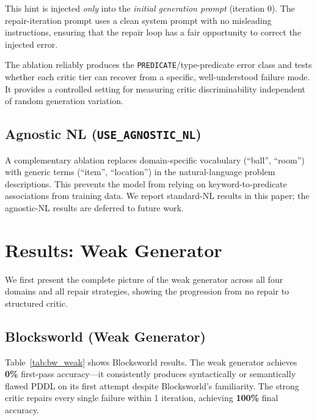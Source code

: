 \documentclass{article}
\begin{document}
This hint is injected \emph{only} into the \emph{initial generation prompt} (iteration
0).  The repair-iteration prompt uses a clean system prompt with no misleading
instructions, ensuring that the repair loop has a fair opportunity to correct the
injected error.

The ablation reliably produces the \texttt{PREDICATE}/type-predicate error class and
tests whether each critic tier can recover from a specific, well-understood failure
mode.  It provides a controlled setting for measuring critic discriminability
independent of random generation variation.

\subsection{Agnostic NL (\texttt{USE\_AGNOSTIC\_NL})}
\label{sec:agnostic}

A complementary ablation replaces domain-specific vocabulary (``ball'', ``room'')
with generic terms (``item'', ``location'') in the natural-language problem
descriptions.  This prevents the model from relying on keyword-to-predicate
associations from training data.  We report standard-NL results in this paper; the
agnostic-NL results are deferred to future work.

\section{Results: Weak Generator}
\label{sec:results_weak}

We first present the complete picture of the weak generator across all four domains
and all repair strategies, showing the progression from no repair to structured critic.

\subsection{Blocksworld (Weak Generator)}
\label{sec:bw_weak}

Table~\ref{tab:bw_weak} shows Blocksworld results.  The weak generator achieves
\textbf{0\%} first-pass accuracy---it consistently produces syntactically or
semantically flawed PDDL on its first attempt despite Blocksworld's familiarity.
The strong critic repairs every single failure within 1 iteration, achieving
\textbf{100\%} final accuracy.
\end{document}

